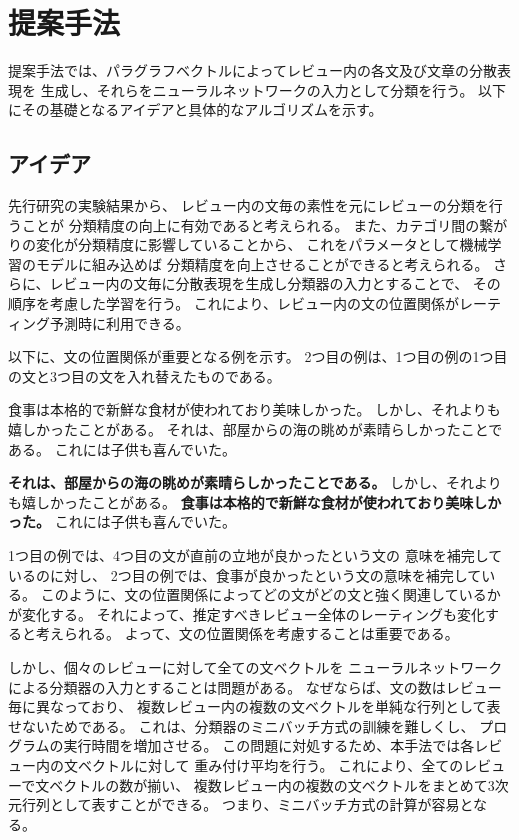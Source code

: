 \documentclass{ttithesis}
\begin{document}
\section{提案手法}

提案手法では、パラグラフベクトルによってレビュー内の各文及び文章の分散表現を
生成し、それらをニューラルネットワークの入力として分類を行う。
以下にその基礎となるアイデアと具体的なアルゴリズムを示す。


\subsection{アイデア}

先行研究\cite{fujitani15}の実験結果から、
レビュー内の文毎の素性を元にレビューの分類を行うことが
分類精度の向上に有効であると考えられる。
また、カテゴリ間の繋がりの変化が分類精度に影響していることから、
これをパラメータとして機械学習のモデルに組み込めば
分類精度を向上させることができると考えられる。
さらに、レビュー内の文毎に分散表現を生成し分類器の入力とすることで、
その順序を考慮した学習を行う。
これにより、レビュー内の文の位置関係がレーティング予測時に利用できる。

以下に、文の位置関係が重要となる例を示す。
2つ目の例は、1つ目の例の1つ目の文と3つ目の文を入れ替えたものである。
\begin{addmargin}{8ex}
  \vspace{1em}
  食事は本格的で新鮮な食材が使われており美味しかった。
  しかし、それよりも嬉しかったことがある。
  それは、部屋からの海の眺めが素晴らしかったことである。
  これには子供も喜んでいた。
\end{addmargin}
\begin{addmargin}{8ex}
  \vspace{1em}
  \textbf{それは、部屋からの海の眺めが素晴らしかったことである。}
  しかし、それよりも嬉しかったことがある。
  \textbf{食事は本格的で新鮮な食材が使われており美味しかった。}
  これには子供も喜んでいた。
\end{addmargin}
1つ目の例では、4つ目の文が直前の立地が良かったという文の
意味を補完しているのに対し、
2つ目の例では、食事が良かったという文の意味を補完している。
このように、文の位置関係によってどの文がどの文と強く関連しているかが変化する。
それによって、推定すべきレビュー全体のレーティングも変化すると考えられる。
よって、文の位置関係を考慮することは重要である。

しかし、個々のレビューに対して全ての文ベクトルを
ニューラルネットワークによる分類器の入力とすることは問題がある。
なぜならば、文の数はレビュー毎に異なっており、
複数レビュー内の複数の文ベクトルを単純な行列として表せないためである。
これは、分類器のミニバッチ方式の訓練を難しくし、
プログラムの実行時間を増加させる。
この問題に対処するため、本手法では各レビュー内の文ベクトルに対して
重み付け平均を行う。
これにより、全てのレビューで文ベクトルの数が揃い、
複数レビュー内の複数の文ベクトルをまとめて3次元行列として表すことができる。
つまり、ミニバッチ方式の計算が容易となる。
\end{document}
